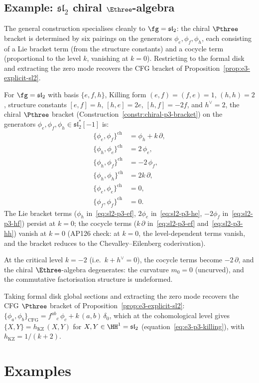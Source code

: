 \subsection{Example: $\mathfrak{sl}_2$ chiral $\Ethree$-algebra}
\label{subsec:sl2-chiral-e3}

The general construction specialises cleanly to
$\fg = \mathfrak{sl}_2$: the chiral $\Pthree$ bracket is
determined by six pairings on the generators
$\phi_e, \phi_f, \phi_h$, each consisting of a Lie bracket
term (from the structure constants) and a cocycle term
(proportional to the level $k$, vanishing at $k = 0$).
Restricting to the formal disk and extracting the zero mode
recovers the CFG bracket of
Proposition~\ref{prop:e3-explicit-sl2}.

\begin{example}
\label{ex:sl2-chiral-e3}
For $\fg = \mathfrak{sl}_2$ with basis $\{e, f, h\}$,
Killing form $(e,f) = (f,e) = 1$, $(h,h) = 2$,
structure constants $[e,f] = h$, $[h,e] = 2e$, $[h,f] = -2f$,
and $h^\vee = 2$, the chiral $\Pthree$ bracket
(Construction~\ref{constr:chiral-p3-bracket}) on the
generators $\phi_e, \phi_f, \phi_h \in \mathfrak{sl}_2^*[-1]$
is:
\begin{align}
  \label{eq:sl2-p3-ef}
  \{\phi_e, \phi_f\}^{\mathrm{ch}}
  &= \phi_h + k\,\partial, \\
  \label{eq:sl2-p3-he}
  \{\phi_h, \phi_e\}^{\mathrm{ch}}
  &= 2\,\phi_e, \\
  \label{eq:sl2-p3-hf}
  \{\phi_h, \phi_f\}^{\mathrm{ch}}
  &= -2\,\phi_f, \\
  \label{eq:sl2-p3-hh}
  \{\phi_h, \phi_h\}^{\mathrm{ch}}
  &= 2k\,\partial, \\
  \label{eq:sl2-p3-ee}
  \{\phi_e, \phi_e\}^{\mathrm{ch}}
  &= 0, \\
  \label{eq:sl2-p3-ff}
  \{\phi_f, \phi_f\}^{\mathrm{ch}}
  &= 0.
\end{align}
The Lie bracket terms ($\phi_h$ in~\eqref{eq:sl2-p3-ef},
$2\phi_e$ in~\eqref{eq:sl2-p3-he},
$-2\phi_f$ in~\eqref{eq:sl2-p3-hf}) persist at $k = 0$;
the cocycle terms ($k\,\partial$ in~\eqref{eq:sl2-p3-ef}
and~\eqref{eq:sl2-p3-hh}) vanish at $k = 0$
(AP126 check: at $k = 0$, the level-dependent terms
vanish, and the bracket reduces to the Chevalley--Eilenberg
coderivation).

At the critical level $k = -2$ (i.e.\ $k + h^\vee = 0$), the cocycle
terms become $-2\,\partial$, and the chiral
$\Ethree$-algebra degenerates: the curvature $m_0 = 0$
(uncurved), and the commutative factorisation structure is
undeformed.

Taking formal disk global sections and extracting the zero
mode recovers the CFG $\Pthree$ bracket of
Proposition~\ref{prop:e3-explicit-sl2}:
$\{\phi_a, \phi_b\}_{\mathrm{CFG}}
= f^{ab}{}_c\,\phi_c + k\,(a,b)\,\delta_0$, which at the
cohomological level gives
$\{X, Y\} = h_{\mathrm{KZ}}\,(X,Y)$ for
$X, Y \in \HH^1 = \mathfrak{sl}_2$
(equation~\eqref{eq:e3-p3-killing}), with
$h_{\mathrm{KZ}} = 1/(k+2)$.
\end{example}

\section{Examples}
\label{sec:examples}
